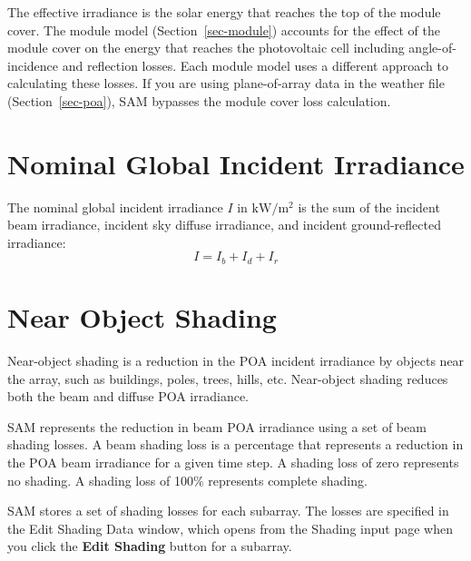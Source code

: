 \documentclass[12pt,letterpaper]{article}
\begin{document}
The effective irradiance is the solar energy that reaches the top of the module cover. The module model (Section~\ref{sec-module}) accounts for the effect of the module cover on the energy that reaches the photovoltaic cell including angle-of-incidence and reflection losses. Each module model uses a different approach to calculating these losses. If you are using plane-of-array data in the weather file (Section~\ref{sec-poa}), SAM bypasses the module cover loss calculation.

\section{Nominal Global Incident Irradiance}\label{sec-nominalincidentirradiance}

The nominal global incident irradiance $I$ in $\mathrm{kW/m^2}$ is the sum of the incident beam irradiance, incident sky diffuse irradiance, and incident ground-reflected irradiance:
\begin{equation}
I = I_{b} + I_{d} + I_{r}
\end{equation}

\section{Near Object Shading}\label{sec-nearobjectshad}

Near-object shading is a reduction in the POA incident irradiance by objects near the array, such as buildings, poles, trees, hills, etc. Near-object shading reduces both the beam and diffuse POA irradiance.

SAM represents the reduction in beam POA irradiance using a set of beam shading losses. A beam shading loss is a percentage that represents a reduction in the POA beam irradiance for a given time step. A shading loss of zero represents no shading. A shading loss of 100\% represents complete shading.

SAM stores a set of shading losses for each subarray. The losses are specified in the Edit Shading Data window, which opens from the Shading input page when you click the \textbf{Edit Shading} button for a subarray.
\end{document}
